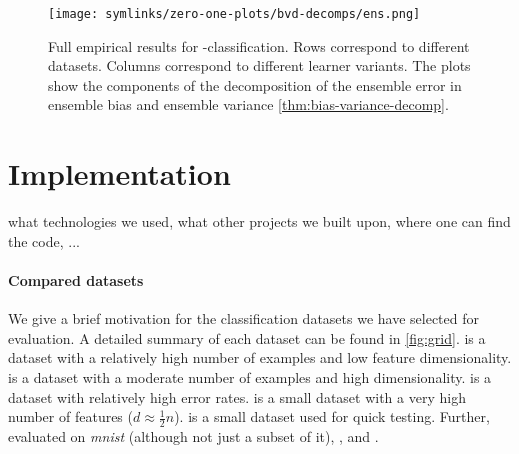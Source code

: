 \documentclass[
    a4paper, %
	fontsize=10pt, %
	twoside=false, %
]{kaobook}
\begin{document}
\begin{figure}[hb]
	\texttt{[image: symlinks/zero-one-plots/bvd-decomps/ens.png]}
	\caption{
        Full empirical results for \zeroone-classification. Rows correspond to different datasets. Columns correspond to different learner variants. The plots show the components of the 
        decomposition of the ensemble error in ensemble bias and ensemble variance \ref{thm:bias-variance-decomp}.
    }
    \label{fig:zero-one-bvd-plots}
\end{figure}


\section{Implementation}

what technologies we used, what other projects we built upon, where one can find the code, ...

\paragraph{Compared datasets} We give a brief motivation for the classification datasets we have selected for evaluation. A detailed summary of each dataset can be found in \ref{fig:grid}.
\cover is a dataset with a relatively high number of examples and low feature dimensionality. \mnist is a dataset with a moderate number of examples and high dimensionality. \diabetes is a dataset with relatively high error rates. \bioresponse is a small dataset with a very high number of features ($d \approx \frac{1}{2}n$). \qsar is a small dataset used for quick testing.
Further, \cite{bernard, xuChen} evaluated on \textit{mnist} (although not just a subset of it), \spambase, \digits and \diabetes.
\end{document}
